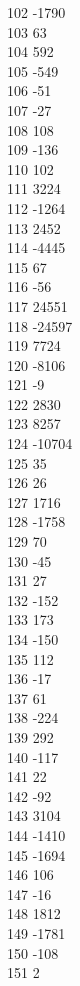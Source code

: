 { 102	-1790 \\
 103	63 \\
 104	592 \\
 105	-549 \\
 106	-51 \\
 107	-27 \\
 108	108 \\
 109	-136 \\
 110	102 \\
 111	3224 \\
 112	-1264 \\
 113	2452 \\
 114	-4445 \\
 115	67 \\
 116	-56 \\
 117	24551 \\
 118	-24597 \\
 119	7724 \\
 120	-8106 \\
 121	-9 \\
 122	2830 \\
 123	8257 \\
 124	-10704 \\
 125	35 \\
 126	26 \\
 127	1716 \\
 128	-1758 \\
 129	70 \\
 130	-45 \\
 131	27 \\
 132	-152 \\
 133	173 \\
 134	-150 \\
 135	112 \\
 136	-17 \\
 137	61 \\
 138	-224 \\
 139	292 \\
 140	-117 \\
 141	22 \\
 142	-92 \\
 143	3104 \\
 144	-1410 \\
 145	-1694 \\
 146	106 \\
 147	-16 \\
 148	1812 \\
 149	-1781 \\
 150	-108 \\
 151	2 \\
}
